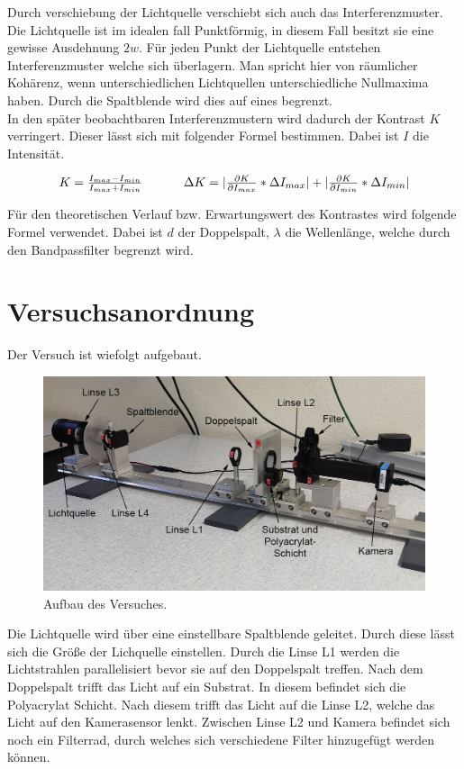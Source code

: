 \documentclass[12pt,a4paper,twoside]{article}
\begin{document}
\noindent
Durch verschiebung der Lichtquelle verschiebt sich auch das Interferenzmuster. Die Lichtquelle ist im idealen fall Punktförmig, in diesem Fall besitzt sie eine gewisse Ausdehnung $2w$. 
Für jeden Punkt der Lichtquelle entstehen Interferenzmuster welche sich überlagern. Man spricht hier von räumlicher Kohärenz, wenn unterschiedlichen Lichtquellen unterschiedliche Nullmaxima haben. 
Durch die Spaltblende wird dies auf eines begrenzt. \\
In den später beobachtbaren Interferenzmustern wird dadurch der Kontrast $K$ verringert. Dieser lässt sich mit folgender Formel bestimmen. Dabei ist $I$ die Intensität. 

\begin{equation}
    \label{eq:Kontrast}
    \centerline{$K = \frac{I_{max} - I_{min}}{I_{max} + I_{min}} $ \\ $\Delta K = \vert \frac{\partial K}{\partial I_{max}} * \Delta I_{max} \vert + \vert \frac{\partial K}{\partial I_{min}} * \Delta I_{min} \vert$} %
\end{equation}

\noindent
Für den theoretischen Verlauf bzw. Erwartungswert des Kontrastes wird folgende Formel verwendet. Dabei ist $d$ der Doppelspalt, $\lambda$ die Wellenlänge, welche durch den Bandpassfilter begrenzt wird. 


\section{Versuchsanordnung} %
Der Versuch ist wiefolgt aufgebaut. 

\begin{figure}[H]
    \centering
    \includegraphics[width=0.6\linewidth]{nudes/aufbau.jpg}
    \caption{Aufbau des Versuches.}
    \label{fig:aufbau}
\end{figure}

\noindent
Die Lichtquelle wird über eine einstellbare Spaltblende geleitet. Durch diese lässt sich die Größe der Lichquelle einstellen. 
Durch die Linse L1 werden die Lichtstrahlen parallelisiert bevor sie auf den Doppelspalt treffen. 
Nach dem Doppelspalt trifft das Licht auf ein Substrat. In diesem befindet sich die Polyacrylat Schicht. 
Nach diesem trifft das Licht auf die Linse L2, welche das Licht auf den Kamerasensor lenkt. Zwischen Linse L2 und Kamera befindet sich noch ein Filterrad, durch welches sich verschiedene Filter hinzugefügt werden können. 
\end{document}
